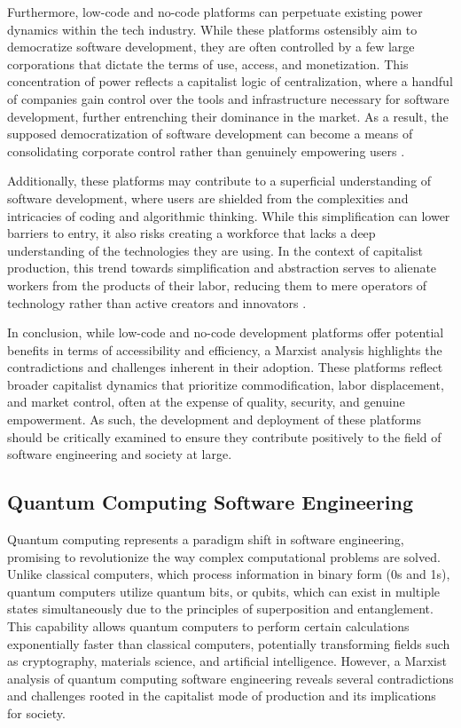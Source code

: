 \begin{refsection}
Furthermore, low-code and no-code platforms can perpetuate existing power dynamics within the tech industry. While these platforms ostensibly aim to democratize software development, they are often controlled by a few large corporations that dictate the terms of use, access, and monetization. This concentration of power reflects a capitalist logic of centralization, where a handful of companies gain control over the tools and infrastructure necessary for software development, further entrenching their dominance in the market. As a result, the supposed democratization of software development can become a means of consolidating corporate control rather than genuinely empowering users \cite[pp.~60-63]{schiller2000digital}.

Additionally, these platforms may contribute to a superficial understanding of software development, where users are shielded from the complexities and intricacies of coding and algorithmic thinking. While this simplification can lower barriers to entry, it also risks creating a workforce that lacks a deep understanding of the technologies they are using. In the context of capitalist production, this trend towards simplification and abstraction serves to alienate workers from the products of their labor, reducing them to mere operators of technology rather than active creators and innovators \cite[pp.~184-187]{braverman1998labor}.

In conclusion, while low-code and no-code development platforms offer potential benefits in terms of accessibility and efficiency, a Marxist analysis highlights the contradictions and challenges inherent in their adoption. These platforms reflect broader capitalist dynamics that prioritize commodification, labor displacement, and market control, often at the expense of quality, security, and genuine empowerment. As such, the development and deployment of these platforms should be critically examined to ensure they contribute positively to the field of software engineering and society at large.

\subsection{Quantum Computing Software Engineering}

Quantum computing represents a paradigm shift in software engineering, promising to revolutionize the way complex computational problems are solved. Unlike classical computers, which process information in binary form (0s and 1s), quantum computers utilize quantum bits, or qubits, which can exist in multiple states simultaneously due to the principles of superposition and entanglement. This capability allows quantum computers to perform certain calculations exponentially faster than classical computers, potentially transforming fields such as cryptography, materials science, and artificial intelligence. However, a Marxist analysis of quantum computing software engineering reveals several contradictions and challenges rooted in the capitalist mode of production and its implications for society.


\end{refsection}
